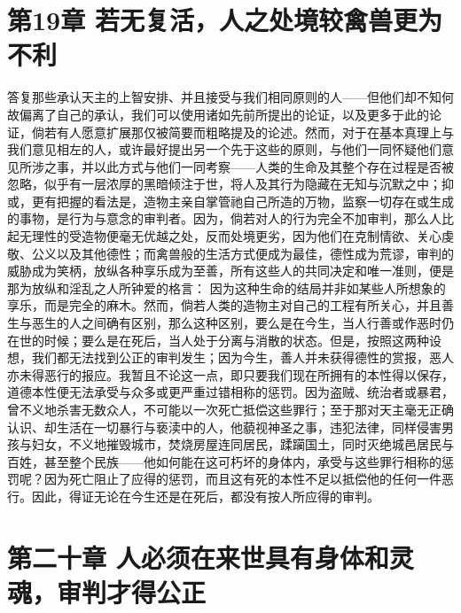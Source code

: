
\section{第19章 若无复活，人之处境较禽兽更为不利}

答复那些承认天主的上智安排、并且接受与我们相同原则的人——但他们却不知何故偏离了自己的承认，我们可以使用诸如先前所提出的论证，以及更多于此的论证，倘若有人愿意扩展那仅被简要而粗略提及的论述。然而，对于在基本真理上与我们意见相左的人，或许最好提出另一个先于这些的原则，与他们一同怀疑他们意见所涉之事，并以此方式与他们一同考察——人类的生命及其整个存在过程是否被忽略，似乎有一层浓厚的黑暗倾注于世，将人及其行为隐藏在无知与沉默之中；抑或，更有把握的看法是，造物主亲自掌管祂自己所造的万物，监察一切存在或生成的事物，是行为与意念的审判者。因为，倘若对人的行为完全不加审判，那么人比起无理性的受造物便毫无优越之处，反而处境更劣，因为他们在克制情欲、关心虔敬、公义以及其他德性；而禽兽般的生活方式便成为最佳，德性成为荒谬，审判的威胁成为笑柄，放纵各种享乐成为至善，所有这些人的共同决定和唯一准则，便是那为放纵和淫乱之人所钟爱的格言： 因为这种生命的结局并非如某些人所想象的享乐，而是完全的麻木。然而，倘若人类的造物主对自己的工程有所关心，并且善生与恶生的人之间确有区别，那么这种区别，要么是在今生，当人行善或作恶时仍在世的时候；要么是在死后，当人处于分离与消散的状态。但是，按照这两种设想，我们都无法找到公正的审判发生；因为今生，善人并未获得德性的赏报，恶人亦未得恶行的报应。我暂且不论这一点，即只要我们现在所拥有的本性得以保存，道德本性便无法承受与众多或更严重过错相称的惩罚。因为盗贼、统治者或暴君，曾不义地杀害无数众人，不可能以一次死亡抵偿这些罪行；至于那对天主毫无正确认识、却生活在一切暴行与亵渎中的人，他藐视神圣之事，违犯法律，同样侵害男孩与妇女，不义地摧毁城市，焚烧房屋连同居民，蹂躏国土，同时灭绝城邑居民与百姓，甚至整个民族——他如何能在这可朽坏的身体内，承受与这些罪行相称的惩罚呢？因为死亡阻止了应得的惩罚，而且这有死的本性不足以抵偿他的任何一件恶行。因此，得证无论在今生还是在死后，都没有按人所应得的审判。\par


\section{第二十章 人必须在来世具有身体和灵魂，审判才得公正}

